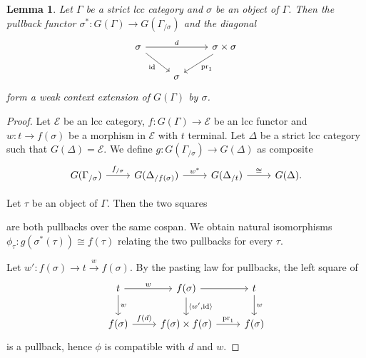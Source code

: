 \documentclass[a4paper]{article}
\newtheorem{lemma}[theorem]{Lemma}
\theoremstyle{remark}
\theoremstyle{definition}
\begin{document}
\begin{lemma}
  \label{lem:slice-is-weak-ext}
  Let $\Gamma$ be a strict lcc category and $\sigma$ be an object of $\Gamma$.
  Then the pullback functor $\sigma^* : G(\Gamma) \rightarrow G(\Gamma_{/ \sigma})$ and the diagonal
  \begin{equation}
    \begin{tikzcd}
      \sigma \arrow[rr, "d"] \arrow[dr, "\mathrm{id}"'] & & \sigma \times \sigma \arrow[dl, "\mathrm{pr}_1"] \\
      & \sigma
    \end{tikzcd}
  \end{equation}
  form a weak context extension of $G(\Gamma)$ by $\sigma$.
\end{lemma}
\begin{proof}
  Let $\mathcal{E}$ be an lcc category, $f : G(\Gamma) \rightarrow \mathcal{E}$ be an lcc functor and $w : t \rightarrow f(\sigma)$ be a morphism in $\mathcal{E}$ with $t$ terminal.
  Let $\Delta$ be a strict lcc category such that $G(\Delta) = \mathcal{E}$.
  We define $g : G(\Gamma_{/ \sigma}) \rightarrow G(\Delta)$ as composite
  \begin{equation}
    \begin{tikzcd}
      G(\Gamma_{/ \sigma}) \arrow[r, "f_{/ \sigma}"] & G(\Delta_{/ f(\sigma)}) \arrow[r, "w^*"] & G(\Delta_{/ t}) \arrow[r, "\cong"] & G(\Delta).
    \end{tikzcd}
  \end{equation}

  Let $\tau$ be an object of $\Gamma$.
  Then the two squares
  are both pullbacks over the same cospan.
  We obtain natural isomorphisms $\phi_\tau : g(\sigma^*(\tau)) \cong f(\tau)$ relating the two pullbacks for every $\tau$.

  Let $w' : f(\sigma) \rightarrow t \xrightarrow{w} f(\sigma)$.
  By the pasting law for pullbacks, the left square of
  \begin{equation}
    \begin{tikzcd}
      t \arrow[r, "w"] \arrow[d, "w"] & f(\sigma) \arrow[d, "{\langle w', \mathrm{id}\rangle}"] \arrow[r] & t \arrow[d, "w"] \\
      f(\sigma) \arrow[r, "f(d)"] & f(\sigma) \times f(\sigma) \arrow[r, "\mathrm{pr}_1"] & f(\sigma)
    \end{tikzcd}
  \end{equation}
  is a pullback, hence $\phi$ is compatible with $d$ and $w$.


\end{proof}
\end{document}
